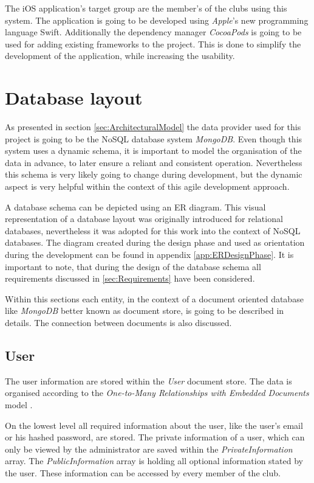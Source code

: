 The iOS application's target group are the member's of the clubs using this system. The application is going to be developed using \emph{Apple}'s new programming language \gls{Swift}. Additionally the dependency manager \emph{CocoaPods} is going to be used for adding existing frameworks to the project. This is done to simplify the development of the application, while increasing the usability.

\section{Database layout}
\label{sec:DatabaseLayout}

As presented in section \vref{sec:ArchitecturalModel} the data provider used for this project is going to be the \gls{NoSQL} database system \emph{MongoDB}. Even though this system uses a dynamic schema, it is important to model the organisation of the data in advance, to later ensure a reliant and consistent operation. Nevertheless this schema is very likely going to change during development, but the dynamic aspect is very helpful within the context of this agile development approach.

A database schema can be depicted using an \gls{ER} diagram. This visual representation of a database layout was originally introduced for relational databases, nevertheless it was adopted for this work into the context of \gls{NoSQL} databases. The diagram created during the design phase and used as orientation during the development can be found in appendix \vref{app:ERDesignPhase}. It is important to note, that during the design of the database schema all requirements discussed in \vref{sec:Requirements} have been considered.

Within this sections each entity, in the context of a document oriented database like \emph{MongoDB} better known as document store, is going to be described in details. The connection between documents is also discussed.

\subsection{User}
The user information are stored within the \emph{User} document store. The data is organised according to the \emph{One-to-Many Relationships with Embedded Documents} model \cite[p. 141]{Mongo:2014aa}.

On the lowest level all required information about the user, like the user's email or his hashed password, are stored. The private information of a user, which can only be viewed by the administrator are saved within the \emph{PrivateInformation} array. The \emph{PublicInformation} array is holding all optional information stated by the user. These information can be accessed by every member of the club.

